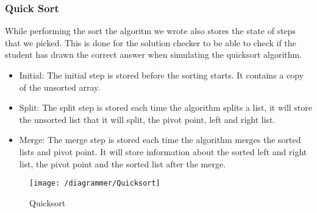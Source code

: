 \subsubsection{Quick Sort}
While performing the sort the algoritm we wrote also stores the state of steps that we picked. This is done for the solution checker to be able to check if the student has drawn the correct answer when simulating the quicksort algorithm.
\begin{itemize}
    \item Initial: The initial step is stored before the sorting starts. It contains a copy of the unsorted array.
    \item Split: The split step is stored each time the algorithm splits a list, it will store the unsorted list that it will split, the pivot point, left and right list.
    \item Merge: The merge step is stored each time the algorithm merges the sorted lists and pivot point. It will store information about the sorted left and right list, the pivot point and the sorted list after the merge.
\end{itemize}
\begin{figure}
    \texttt{[image: /diagrammer/Quicksort]}
    \caption{Quicksort}
    \label{fig:quicksort}
\end{figure}